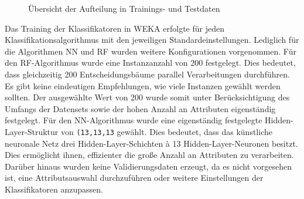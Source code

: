 \begin{figure}[t]
  \qquad
  \qquad
  \caption{Übersicht der Aufteilung in Trainings- und Testdaten\label{fig:splits}}
\end{figure}

Das Training der Klassifikatoren in WEKA erfolgte für jeden Klassifikationsalgorithmus mit den jeweiligen Standardeinstellungen. Lediglich für die Algorithmen NN und RF wurden weitere Konfigurationen vorgenommen. Für den RF-Algorithmus wurde eine Instanzanzahl von 200 festgelegt. Dies bedeutet, dass gleichzeitig 200 Entscheidungsbäume parallel Verarbeitungen durchführen. Es gibt keine eindeutigen Empfehlungen, wie viele Instanzen gewählt werden sollten. Der ausgewählte Wert von 200 wurde somit unter Berücksichtigung des Umfangs der Datensets sowie der hohen Anzahl an Attributen eigenständig festgelegt. Für den NN-Algorithmus wurde eine eigenständig festgelegte Hidden-Layer-Struktur von \texttt{(13,13,13} gewählt. Dies bedeutet, dass das künstliche neuronale Netz drei Hidden-Layer-Schichten à 13 Hidden-Layer-Neuronen besitzt. Dies ermöglicht ihnen, effizienter die große Anzahl an Attributen zu verarbeiten. Darüber hinaus wurden keine Validierungsdaten erzeugt, da es nicht vorgesehen ist, eine Attributsauswahl durchzuführen oder weitere Einstellungen der Klassifikatoren anzupassen.

